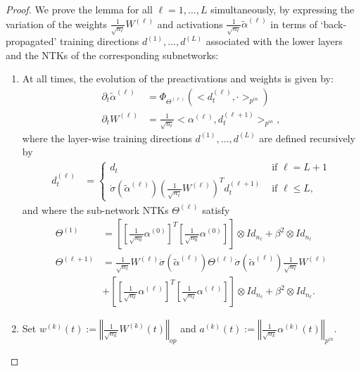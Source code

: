 \documentclass{article}
\begin{document}
\begin{proof}
We prove the lemma for all $ \ell =1, \ldots, L $ simultaneously, by expressing the variation of the weights $ \frac{1}{\sqrt{n_\ell}} W^{(\ell)} $ and activations $ \frac{1}{\sqrt{n_\ell}} \tilde{\alpha}^{(\ell)} $ in terms of `back-propagated' training directions $ d^{(1)}, \ldots, d^{(L)} $ associated with the lower layers and the NTKs of the corresponding subnetworks:    
\begin{enumerate}
	 \item At all times, the evolution of the preactivations and weights is given by:
\begin{align*}
\partial_{t}\tilde{\alpha}^{(\ell)} & =\Phi_{\Theta^{(\ell)}} \left( <d_{t}^{(\ell)},\cdot>_{p^{in}} \right) \\
\partial_{t}W^{(\ell)} & =\frac{1}{\sqrt{n_{\ell}}}<\alpha^{(\ell)},d_{t}^{(\ell+1)}>_{p^{in}}, 
\end{align*}
where the layer-wise training directions $ d^{(1)}, \ldots, d^{(L)} $ are defined recursively by 
\begin{align*}
d_{t}^{\left(\ell\right)} & =\begin{cases}
d_{t} & \text{ if }\ell=L+1\\
\dot{\sigma}\left(\tilde{\alpha}^{\left(\ell\right)}\right)\left(\frac{1}{\sqrt{n_{\ell}}}W^{\left(\ell\right)}\right)^{T}d_{t}^{\left(\ell+1\right)} & \text{ if }\ell\leq L,
\end{cases}
\end{align*}
and where the sub-network NTKs $ \Theta^{(\ell)}$ satisfy 
\begin{align*}
\Theta^{(1)} & =\left[\left[\frac{1}{\sqrt{n_{0}}}\alpha^{(0)}\right]^{T}\left[\frac{1}{\sqrt{n_{0}}}\alpha^{(0)}\right]\right]\otimes Id_{n_{\ell}}+\beta^{2}\otimes Id_{n_{\ell}}\\
\Theta^{(\ell+1)} & =\frac{1}{\sqrt{n_{\ell}}}W^{(\ell)}\dot{\sigma}(\tilde{\alpha}^{(\ell)})\Theta^{(\ell)}\dot{\sigma}(\tilde{\alpha}^{(\ell)})\frac{1}{\sqrt{n_{\ell}}}W^{(\ell)}\\
 & +\left[\left[\frac{1}{\sqrt{n_{\ell}}}\alpha^{(\ell)}\right]^{T}\left[\frac{1}{\sqrt{n_{\ell}}}\alpha^{(\ell)}\right]\right]\otimes Id_{n_{\ell}}+\beta^{2}\otimes Id_{n_{\ell}}.
\end{align*}
\item
Set $ w^{(k)} (t) := \left\Vert \frac{1}{\sqrt{n_{k}}}W^{(k)} (t)\right\Vert _{op} $ and
$a^{(k)}\left(t\right):=\left\Vert \frac{1}{\sqrt{n_{k}}}\alpha^{\left(k\right)}\left(t\right)\right\Vert _{p^{in}}$.

\end{enumerate}
\end{proof}
\end{document}
